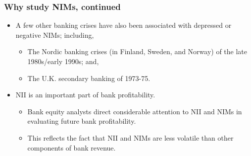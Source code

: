\documentclass[handout]{beamer}
\begin{document}
\begin{frame}
\frametitle{Why study NIMs, continued}
\begin{itemize}
\item \vspace{0.0in} A few other banking crises have also been associated with depressed or negative NIMs; including,
\begin{itemize}
\item \vspace{0.125in} The Nordic banking crises (in Finland, Sweden, and Norway) of the late 1980s/early 1990s; and,
\item \vspace{0.125in} The U.K. secondary banking of 1973-75.
\end{itemize}
\item \vspace{0.25in} NII is an important part of bank profitability.
\begin{itemize}
\item \vspace{0.125in} Bank equity analysts direct considerable attention to NII and NIMs in evaluating future bank profitability.
\item \vspace{0.125in} This reflects the fact that NII and NIMs are less volatile than other components of bank revenue.
\end{itemize}
\end{itemize}
\end{frame}
\end{document}
